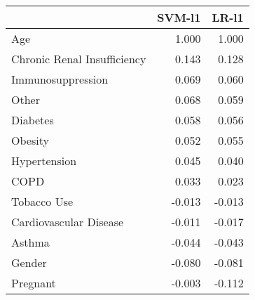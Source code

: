 \begin{tabular}{lrr}
\toprule
{} &  SVM-l1 &  LR-l1 \\
\midrule
Age                         &   1.000 &  1.000 \\
Chronic Renal Insufficiency &   0.143 &  0.128 \\
Immunosuppression           &   0.069 &  0.060 \\
Other                       &   0.068 &  0.059 \\
Diabetes                    &   0.058 &  0.056 \\
Obesity                     &   0.052 &  0.055 \\
Hypertension                &   0.045 &  0.040 \\
COPD                        &   0.033 &  0.023 \\
Tobacco Use                 &  -0.013 & -0.013 \\
Cardiovascular Disease      &  -0.011 & -0.017 \\
Asthma                      &  -0.044 & -0.043 \\
Gender                      &  -0.080 & -0.081 \\
Pregnant                    &  -0.003 & -0.112 \\
\bottomrule
\end{tabular}
